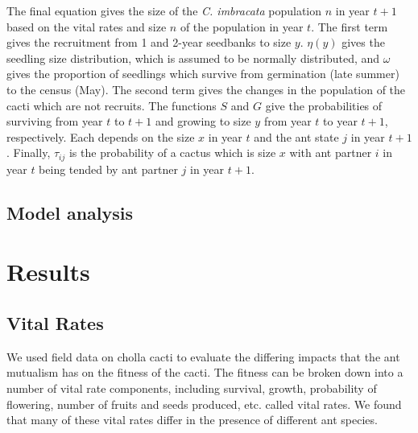 \documentclass[12pt,a4paper]{article}
\begin{document}
    The final equation gives the size of the \textit{C. imbracata} population $n$ in year $t+1$ based on the vital rates and size $n$ of the population in year $t$. The first term gives the recruitment from 1 and 2-year seedbanks to size $y$. $\eta(y)$ gives the seedling size distribution, which is assumed to be normally distributed, and $\omega$ gives the proportion of seedlings which survive from germination (late summer) to the census (May). The second term gives the changes in the population of the cacti which are not recruits. The functions $S$ and $G$ give the probabilities of surviving from year $t$ to $t+1$ and growing to size $y$ from year $t$ to year $t+1$, respectively. Each depends on the size $x$ in year $t$ and the ant state $j$ in year $t+1$. Finally, $\tau_{ij}$ is the probability of a cactus which is size $x$ with ant partner $i$ in year $t$ being tended by ant partner $j$ in year $t+1$. 
    
    \subsection*{Model analysis}
    
    

	\section*{Results}
	\subsection*{Vital Rates}
	
	We used field data on cholla cacti to evaluate the differing impacts that the ant mutualism has on the fitness of the cacti. The fitness can be broken down into a number of vital rate components, including survival, growth, probability of flowering, number of fruits and seeds produced, etc. called vital rates. We found that many of these vital rates differ in the presence of different ant species. 
	
\end{document}
